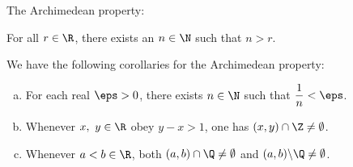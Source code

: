 \begin{property}
	The Archimedean property:
	
	\medskip
	
	For all \(r\in\R\), there exists an \(n\in\N\) such that \(n>r\).
\end{property}
\begin{corollary}
	We have the following corollaries for the Archimedean property:
	\begin{enumerate}[(a)]
		\item For each real \(\eps>0\), there exists \(n\in\N\) such that \(\displaystyle\frac{1}{n}<\eps\).
		
		\item Whenever \(x,~y\in\R\) obey \(y-x>1\), one has \((x,y)\cap\Z\neq\emptyset\).
		
		\item Whenever \(a<b\in\R\), both \((a,b)\cap\Q\neq\emptyset\) and \((a,b)\backslash\Q\neq\emptyset\).
	\end{enumerate}
\end{corollary}
